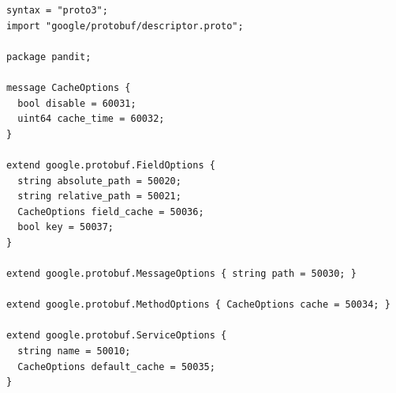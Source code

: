 \documentclass[a4paper,12pt]{report}
\begin{document}
\begin{lstlisting}
syntax = "proto3";
import "google/protobuf/descriptor.proto";

package pandit;

message CacheOptions {
  bool disable = 60031;
  uint64 cache_time = 60032;
}

extend google.protobuf.FieldOptions {
  string absolute_path = 50020;
  string relative_path = 50021;
  CacheOptions field_cache = 50036;
  bool key = 50037;
}

extend google.protobuf.MessageOptions { string path = 50030; }

extend google.protobuf.MethodOptions { CacheOptions cache = 50034; }

extend google.protobuf.ServiceOptions {
  string name = 50010;
  CacheOptions default_cache = 50035;
}
\end{lstlisting}
\end{document}

